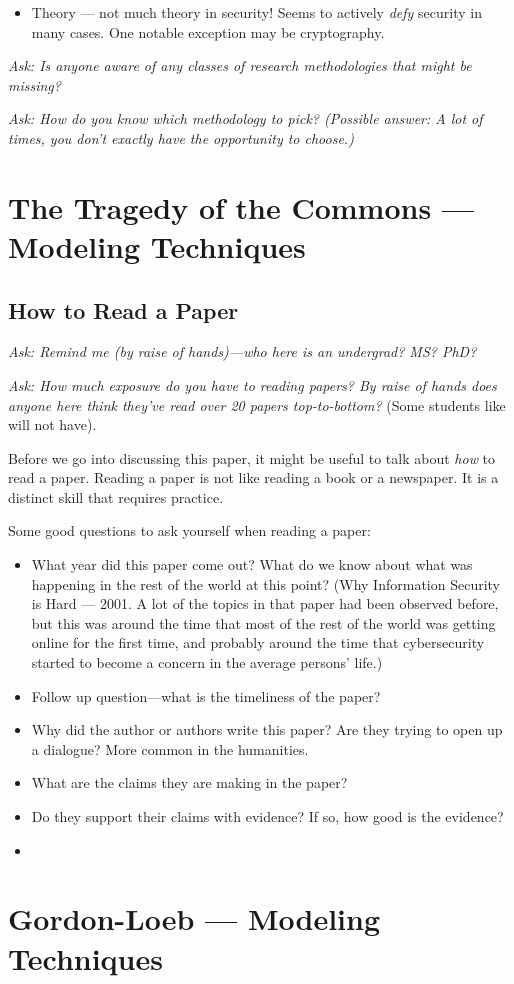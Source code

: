 \documentclass[11pt]{article}
\begin{document}
\begin{itemize}
    \item Theory --- not much theory in security! Seems to actively {\it defy} security in many cases. One notable exception may be cryptography.
\end{itemize}


{\it Ask: Is anyone aware of any classes of research methodologies that might be missing? }

{\it Ask: How do you know which methodology to pick? (Possible answer: A lot of times, you don't exactly have the opportunity to choose.)}




\section{The Tragedy of the Commons --- Modeling Techniques}

\subsection{How to Read a Paper}

{\it Ask: Remind me (by raise of hands)---who here is an undergrad? MS? PhD?}

{\it Ask: How much exposure do you have to reading papers? By raise of hands does anyone here think they've read over 20 papers top-to-bottom?} (Some students like will not have).

Before we go into discussing this paper, it might be useful to talk about {\it how} to read a paper. Reading a paper is not like reading a book or a newspaper. It is a distinct skill that requires practice.

Some good questions to ask yourself when reading a paper:

\begin{itemize}
    \item What year did this paper come out? What do we know about what was happening in the rest of the world at this point? (Why Information Security is Hard --- 2001. A lot of the topics in that paper had been observed before, but this was around the time that most of the rest of the world was getting online for the first time, and probably around the time that cybersecurity started to become a concern in the average persons' life.)
    \item Follow up question---what is the timeliness of the paper?
    \item Why did the author or authors write this paper? Are they trying to open up a dialogue? More common in the humanities.
    \item What are the claims they are making in the paper?
    \item Do they support their claims with evidence? If so, how good is the evidence?
    \item 
\end{itemize}


\section{Gordon-Loeb --- Modeling Techniques}
\end{document}
